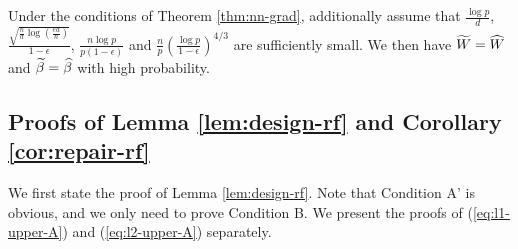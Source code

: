 \begin{thm}\label{thm:repair-nn-2}
Under the conditions of Theorem \ref{thm:nn-grad}, additionally assume that $\frac{\log p}{d}$, $\frac{\sqrt{\frac{n}{d}\log\left(\frac{ed}{n}\right)}}{1-\epsilon}$, $\frac{n\log p}{p(1-\epsilon)}$ and $\frac{n}{p}\left(\frac{\log p}{1-\epsilon}\right)^{4/3}$ are sufficiently small. We then have $\widetilde{W}=\widehat{W}$ and $\widetilde{\beta}=\widehat{\beta}$ with high probability.
\end{thm}


\subsection{Proofs of Lemma \ref{lem:design-rf} and Corollary \ref{cor:repair-rf}}

We first state the proof of Lemma \ref{lem:design-rf}. Note that Condition A' is obvious, and we only need to prove Condition B. We present the proofs of (\ref{eq:l1-upper-A}) and (\ref{eq:l2-upper-A}) separately.
